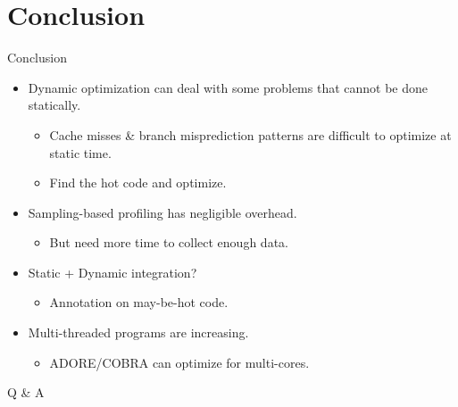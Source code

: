 \documentclass[aspectratio=169,xcolor=x11names]{beamer}
\begin{document}
	\section{Conclusion}
	\begin{frame}{Conclusion}
		\begin{itemize}
			\item Dynamic optimization can deal with some problems that cannot be done statically.
			\begin{itemize}
				\item Cache misses \& branch misprediction patterns are difficult to optimize at static time.
				\item Find the hot code and optimize.
			\end{itemize}
			\item Sampling-based profiling has negligible overhead.
			\begin{itemize}
				\item But need more time to collect enough data.
			\end{itemize}
			\item Static + Dynamic integration?
			\begin{itemize}
				\item Annotation on may-be-hot code.
			\end{itemize}
			\item Multi-threaded programs are increasing.
			\begin{itemize}
				\item ADORE/COBRA can optimize for multi-cores.
			\end{itemize}
		\end{itemize}
	\end{frame}

	\begin{frame}[standout]
		Q \& A
	\end{frame}
\end{document}
